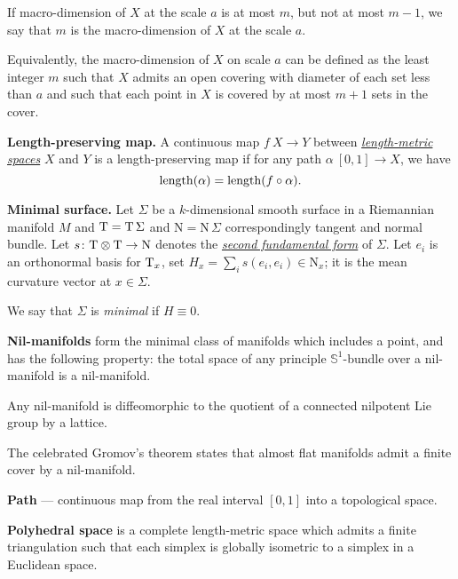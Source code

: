 \begin{description}
If macro-dimension of $X$ at the scale $a$ is at most $m$,
but not at most $m-1$, 
we say that $m$ is the macro-dimension of $X$ at the scale $a$.

Equivalently, the macro-dimension of $X$ on scale $a$ can be defined as 
the least integer $m$ such that $X$ admits an open covering with diameter of each set less than $a$ 
and such that each point in $X$ is covered by at most $m+1$ sets in the cover.


\item{\bf Length-preserving map.}\label{Length-preserving map} 
A continuous map $f\:X\to Y$ between 
\hyperref[Length-metric space]{\emph{length-metric spaces}} 
$X$ and $Y$ is a length-preserving map if for any path $\alpha\:[0,1]\to X$, we have 
$$\operatorname{\rm length}(\alpha)=\operatorname{\rm length}(f\circ\alpha).$$

\item{\bf Minimal surface.}\label{Minimal surface} 
Let $\Sigma$ be a $k$-dimensional smooth surface in
a Riemannian manifold $M$
and $\mathrm{T}=\mathrm{T}\,\Sigma$ and $\mathrm{N}=\mathrm{N}\,\Sigma$ correspondingly tangent and normal bundle.
Let $s\colon\mathrm{T}\otimes \mathrm{T}\to \mathrm{N}$ denotes the \hyperref[Second fundamental form]{\emph{second fundamental form}} of $\Sigma$.
Let  $e_i$ is an orthonormal basis for $\mathrm{T}_x$, 
set $H_x=\sum_i s(e_i,e_i)\in \mathrm{N}_x$; 
it is the mean curvature vector at $x\in \Sigma$. 

We say that $\Sigma$ is \emph{minimal} if $H\equiv 0$.

\item{\bf Nil-manifolds}\label{Nil-manifolds} form the minimal class of manifolds which includes a point, and has the following property:  
the total space of any principle $\mathbb{S}^1$-bundle over a nil-manifold is a nil-manifold. 

Any nil-manifold is diffeomorphic to the quotient of a connected nilpotent Lie group by a lattice.

The celebrated Gromov's theorem states that almost flat manifolds admit a finite cover by a nil-manifold.

\item{\bf Path}\label{Path} --- continuous map from the real interval $[0,1]$ into a topological space. 

\item{\bf Polyhedral space}\label{Polyhedral space}
is a complete length-metric space which admits a finite triangulation 
such that each simplex is globally isometric to a simplex in a Euclidean space.


\end{description}
